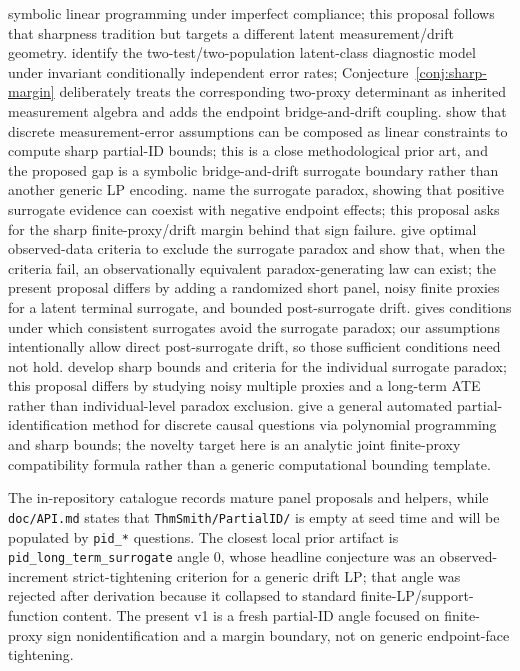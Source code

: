 \documentclass[11pt]{article}
\theoremstyle{definition}
\theoremstyle{plain}
\theoremstyle{remark}
\begin{document}
symbolic linear programming under imperfect compliance; this proposal follows that sharpness tradition but targets a different latent measurement/drift geometry.  \citet{HuiWalter1980} identify the two-test/two-population latent-class diagnostic model under invariant conditionally independent error rates; Conjecture~\ref{conj:sharp-margin} deliberately treats the corresponding two-proxy determinant as inherited measurement algebra and adds the endpoint bridge-and-drift coupling.  \citet{FinkelsteinAdamsSariaShpitser2021} show that discrete measurement-error assumptions can be composed as linear constraints to compute sharp partial-ID bounds; this is a close methodological prior art, and the proposed gap is a symbolic bridge-and-drift surrogate boundary rather than another generic LP encoding.  \citet{ChenGengJia2007} name the surrogate paradox, showing that positive surrogate evidence can coexist with negative endpoint effects; this proposal asks for the sharp finite-proxy/drift margin behind that sign failure.  \citet{YinLiuGengLuo2020} give optimal observed-data criteria to exclude the surrogate paradox and show that, when the criteria fail, an observationally equivalent paradox-generating law can exist; the present proposal differs by adding a randomized short panel, noisy finite proxies for a latent terminal surrogate, and bounded post-surrogate drift.  \citet{VanderWeele2013} gives conditions under which consistent surrogates avoid the surrogate paradox; our assumptions intentionally allow direct post-surrogate drift, so those sufficient conditions need not hold.  \citet{MaYinLiuGeng2021} develop sharp bounds and criteria for the individual surrogate paradox; this proposal differs by studying noisy multiple proxies and a long-term ATE rather than individual-level paradox exclusion.  \citet{DuarteFinkelsteinKnoxMummoloShpitser2024} give a general automated partial-identification method for discrete causal questions via polynomial programming and sharp bounds; the novelty target here is an analytic joint finite-proxy compatibility formula rather than a generic computational bounding template.

The in-repository catalogue records mature panel proposals and helpers, while \texttt{doc/API.md} states that \texttt{ThmSmith/PartialID/} is empty at seed time and will be populated by \texttt{pid\_*} questions.  The closest local prior artifact is \texttt{pid\_long\_term\_surrogate} angle 0, whose headline conjecture was an observed-increment strict-tightening criterion for a generic drift LP; that angle was rejected after derivation because it collapsed to standard finite-LP/support-function content.  The present v1 is a fresh partial-ID angle focused on finite-proxy sign nonidentification and a margin boundary, not on generic endpoint-face tightening.
\end{document}
